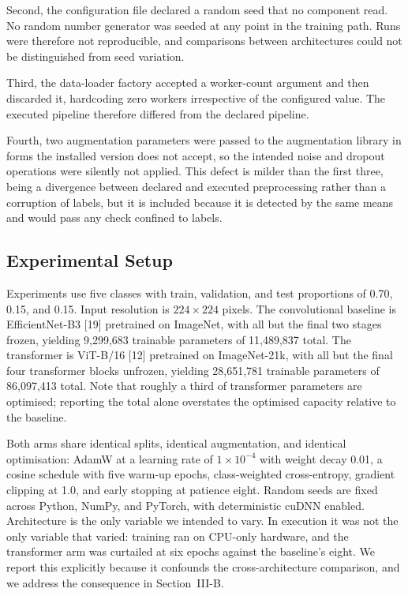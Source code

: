 \documentclass[11pt,journal]{IEEEtran}
\begin{document}
Second, the configuration file declared a random seed that no component read.
No random number generator was seeded at any point in the training path. Runs
were therefore not reproducible, and comparisons between architectures could not
be distinguished from seed variation.

Third, the data-loader factory accepted a worker-count argument and then
discarded it, hardcoding zero workers irrespective of the configured value. The
executed pipeline therefore differed from the declared pipeline.

Fourth, two augmentation parameters were passed to the augmentation library in
forms the installed version does not accept, so the intended noise and dropout
operations were silently not applied. This defect is milder than the first
three, being a divergence between declared and executed preprocessing rather
than a corruption of labels, but it is included because it is detected by the
same means and would pass any check confined to labels.

\subsection{Experimental Setup}

Experiments use five classes with train, validation, and test proportions of
0.70, 0.15, and 0.15. Input resolution is $224\times224$ pixels. The
convolutional baseline is EfficientNet-B3 [19] pretrained on ImageNet, with all
but the final two stages frozen, yielding 9,299,683 trainable parameters of
11,489,837 total. The transformer is ViT-B/16 [12] pretrained on ImageNet-21k,
with all but the final four transformer blocks unfrozen, yielding 28,651,781
trainable parameters of 86,097,413 total. Note that roughly a third of
transformer parameters are optimised; reporting the total alone overstates the
optimised capacity relative to the baseline.

Both arms share identical splits, identical augmentation, and identical
optimisation: AdamW at a learning rate of $1\times10^{-4}$ with weight decay
0.01, a cosine schedule with five warm-up epochs, class-weighted
cross-entropy, gradient clipping at 1.0, and early stopping at patience eight.
Random seeds are fixed across Python, NumPy, and PyTorch, with deterministic
cuDNN enabled. Architecture is the only variable we intended to vary. In
execution it was not the only variable that varied: training ran on CPU-only
hardware, and the transformer arm was curtailed at six epochs against the
baseline's eight. We report this explicitly because it confounds the
cross-architecture comparison, and we address the consequence in
Section~III-B.
\end{document}
